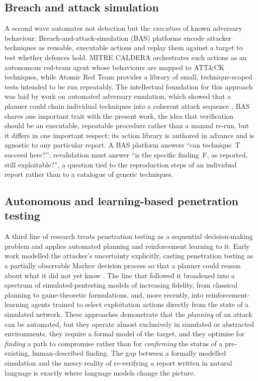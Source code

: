 \subsection{Breach and attack simulation}
\label{subsec:bas}

A second wave automates not detection but the \emph{execution} of known adversary
behaviour. Breach-and-attack-simulation (BAS) platforms encode attacker techniques
as reusable, executable actions and replay them against a target to test whether
defences hold. MITRE CALDERA orchestrates such actions as an
autonomous red-team agent whose behaviours are mapped to ATT\&CK techniques, while
Atomic Red Team provides a library of small, technique-scoped
tests intended to be run repeatably. The intellectual foundation for this
approach was laid by work on automated adversary emulation, which showed that a
planner could chain individual techniques into a coherent attack sequence
\cite{applebaum2016}. BAS shares one important trait with the present work, the
idea that verification should be an executable, repeatable procedure rather than a
manual re-run, but it differs in one important respect: its action library is
authored in advance and is agnostic to any particular report. A BAS platform
answers ``can technique~T succeed here?''; revalidation must answer ``is the
specific finding~F, as reported, still exploitable?'', a question tied to the
reproduction steps of an individual report rather than to a catalogue of generic
techniques.

\subsection{Autonomous and learning-based penetration testing}
\label{subsec:autonomous}

A third line of research treats penetration testing as a sequential
decision-making problem and applies automated planning and reinforcement learning
to it. Early work modelled the attacker's uncertainty explicitly, casting
penetration testing as a partially observable Markov decision process so that a
planner could reason about what it did not yet know \cite{sarraute2012}. The line
that followed it broadened into a spectrum of simulated-pentesting models of
increasing fidelity, from classical planning to game-theoretic formulations,
and, more recently, into reinforcement-learning agents trained to select
exploitation actions directly from the state of a simulated network. These
approaches demonstrate that the
\emph{planning} of an attack can be automated, but they operate almost exclusively
in simulated or abstracted environments, they require a formal model of the target,
and they optimise for \emph{finding} a path to compromise rather than for
\emph{confirming} the status of a pre-existing, human-described finding. The gap
between a formally modelled simulation and the messy reality of re-verifying a
report written in natural language is exactly where language models change the
picture.

